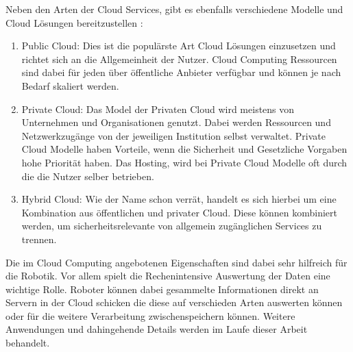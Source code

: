 Neben den Arten der Cloud Services, gibt es ebenfalls verschiedene Modelle und Cloud Lösungen bereitzustellen \cite{antonopoulosCloudComputingPrinciples2017}:

\begin{enumerate}
  \item Public Cloud: Dies ist die populärste Art Cloud Lösungen einzusetzen und richtet sich an die Allgemeinheit der Nutzer. Cloud Computing Ressourcen sind dabei für jeden über öffentliche Anbieter verfügbar und können je nach Bedarf skaliert werden.
  \item Private Cloud: Das Model der Privaten Cloud wird meistens von Unternehmen und Organisationen genutzt. Dabei werden Ressourcen und Netzwerkzugänge von der jeweiligen Institution selbst verwaltet. Private Cloud Modelle haben Vorteile, wenn die Sicherheit und Gesetzliche Vorgaben hohe Priorität haben. Das Hosting, wird bei Private Cloud Modelle oft durch die die Nutzer selber betrieben.
  \item Hybrid Cloud: Wie der Name schon verrät, handelt es sich hierbei um eine Kombination aus öffentlichen und privater Cloud. Diese können kombiniert werden, um sicherheitsrelevante von allgemein zugänglichen Services zu trennen.
\end{enumerate}

Die im Cloud Computing angebotenen Eigenschaften sind dabei sehr hilfreich für die Robotik. Vor allem spielt die Rechenintensive Auswertung der Daten eine wichtige Rolle. Roboter können dabei gesammelte Informationen direkt an Servern in der Cloud schicken die diese auf verschieden Arten auswerten können oder für die weitere Verarbeitung zwischenspeichern können. Weitere Anwendungen und dahingehende Details werden im Laufe dieser Arbeit behandelt.
